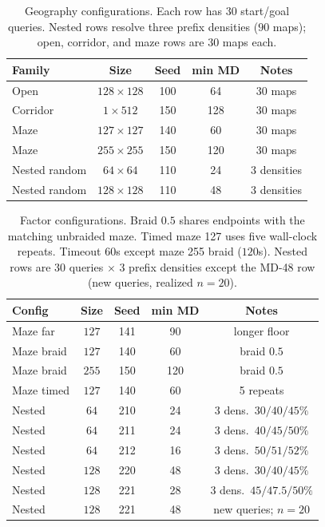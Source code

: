 \begin{table}[tb]
\centering
\small
\caption{Geography configurations. Each row has 30 start/goal queries. Nested rows resolve three prefix densities (\(90\) maps); open, corridor, and maze rows are \(30\) maps each.}
\label{tab:instances}
\begin{tabular}{@{}lcccc@{}}
\toprule
Family & Size & Seed & min MD & Notes \\
\midrule
Open & \(128\times 128\) & 100 & 64 & \(30\) maps \\
Corridor & \(1\times 512\) & 150 & 128 & \(30\) maps \\
Maze & \(127\times 127\) & 140 & 60 & \(30\) maps \\
Maze & \(255\times 255\) & 150 & 120 & \(30\) maps \\
Nested random & \(64\times 64\) & 110 & 24 & 3 densities \\
Nested random & \(128\times 128\) & 110 & 48 & 3 densities \\
\bottomrule
\end{tabular}
\end{table}

\begin{table}[tb]
\centering
\small
\caption{Factor configurations. Braid \(0.5\) shares endpoints with the matching unbraided maze. Timed maze 127 uses five wall-clock repeats. Timeout \(60\)s except maze 255 braid (\(120\)s). Nested rows are 30 queries \(\times\) 3 prefix densities except the MD-48 row (new queries, realized \(n=20\)).}
\label{tab:factors}
\begin{tabular}{@{}lcccc@{}}
\toprule
Config & Size & Seed & min MD & Notes \\
\midrule
Maze far & \(127\) & 141 & 90 & longer floor \\
Maze braid & \(127\) & 140 & 60 & braid \(0.5\) \\
Maze braid & \(255\) & 150 & 120 & braid \(0.5\) \\
Maze timed & \(127\) & 140 & 60 & 5 repeats \\
Nested & \(64\) & 210 & 24 & 3 dens.\ \(30/40/45\%\) \\
Nested & \(64\) & 211 & 24 & 3 dens.\ \(40/45/50\%\) \\
Nested & \(64\) & 212 & 16 & 3 dens.\ \(50/51/52\%\) \\
Nested & \(128\) & 220 & 48 & 3 dens.\ \(30/40/45\%\) \\
Nested & \(128\) & 221 & 28 & 3 dens.\ \(45/47.5/50\%\) \\
Nested & \(128\) & 221 & 48 & new queries; \(n=20\) \\
\bottomrule
\end{tabular}
\end{table}

